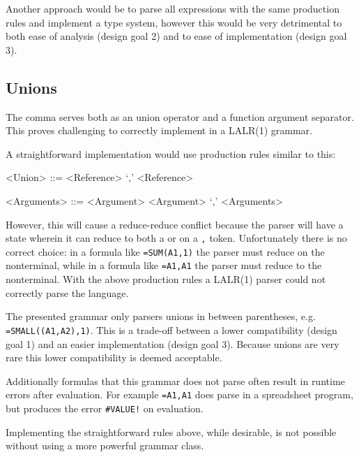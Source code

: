 Another approach would be to parse all expressions with the same production rules and implement a type system, however this would be very detrimental to both ease of analysis (design goal 2) and to ease of implementation (design goal 3).

\subsection{\textbf{Unions}}
\label{subsec:desing:unions}

The comma serves both as an union operator and a function argument separator.
This proves challenging to correctly implement in a LALR(1) grammar.

A straightforward implementation would use production rules similar to this:
\begin{grammar}
<Union> ::= <Reference> `,' <Reference>

<Arguments> ::= <Argument>
	\alt <Argument> `,' <Arguments>
\end{grammar}

However, this will cause a reduce-reduce conflict because the parser will have a state wherein it can reduce to both a  or  on a \texttt{,} token.
Unfortunately there is no correct choice: in a formula like \texttt{=SUM(A1,1)} the parser must reduce on the  nonterminal, while in a formula like \texttt{=A1,A1} the parser must reduce to the  nonterminal.
With the above production rules a LALR(1) parser could not correctly parse the language.

The presented grammar only parsers unions in between parentheses, e.g. \texttt{=SMALL((A1,A2),1)}.
This is a trade-off between a lower compatibility (design goal 1) and an easier implementation (design goal 3).
Because unions are very rare \cite{grammarpaper} this lower compatibility is deemed acceptable.

Additionally formulas that this grammar does not parse often result in runtime errors after evaluation.
For example \texttt{=A1,A1} does parse in a spreadsheet program, but produces the error \texttt{\#VALUE!} on evaluation.

Implementing the straightforward rules above, while desirable, is not possible without using a more powerful grammar class.